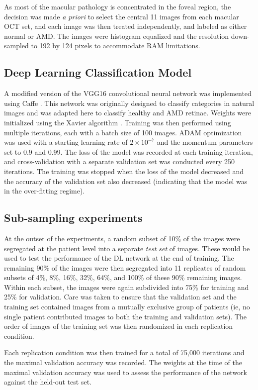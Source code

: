 As most of the macular pathology is concentrated in the foveal region, the
decision was made \emph{a priori} to select the central 11 images from each
macular OCT set, and each image was then treated independently, and labeled as
either normal or AMD. The images were histogram equalized and the resolution
down-sampled to 192 by 124 pixels to accommodate RAM limitations.

\subsection{Deep Learning Classification Model}

A modified version of the VGG16 convolutional neural network
\citep{Simonyan2014-al} was implemented using Caffe \citep{jia2014caffe}. This
network was originally designed to classify categories in natural images and was
adapted here to classify healthy and AMD retinae. Weights were initialized using
the Xavier algorithm \citep{Glorot2010-is}. Training was then performed using
multiple iterations, each with a batch size of 100 images. ADAM optimization
\citep{Kingma2014-jl} was used with a starting learning rate of $2 \times
10^{-7}$ and the momentum parameters set to 0.9 and 0.99. The loss of the model
was recorded at each training iteration, and cross-validation with a separate
validation set was conducted every 250 iterations. The training was stopped when
the loss of the model decreased and the accuracy of the validation set
also decreased (indicating that the model was in the over-fitting regime).

\subsection{Sub-sampling experiments}

At the outset of the experiments, a random subset of 10\% of the images were
segregated at the patient level into a separate \emph{test set} of images. These
would be used to test the performance of the DL network at the end of training.
The remaining 90\% of the images were then segregated into 11 replicates of random subsets of 4\%, 8\%, 16\%, 32\%, 64\%, and 100\% of these 90\% remaining images.
Within each subset, the images were again subdivided into 75\% for training and
25\% for validation. Care was taken to ensure that the validation set and the
training set contained images from a mutually exclusive group of patients (ie,
no single patient contributed images to both the training and validation sets).
The order of images of the training set was then randomized in each replication
condition.

Each replication condition was then trained for a total of 75,000 iterations
and the maximal validation accuracy was recorded. The weights at the time of
the maximal validation accuracy was used to assess the performance of the
network against the held-out test set.
